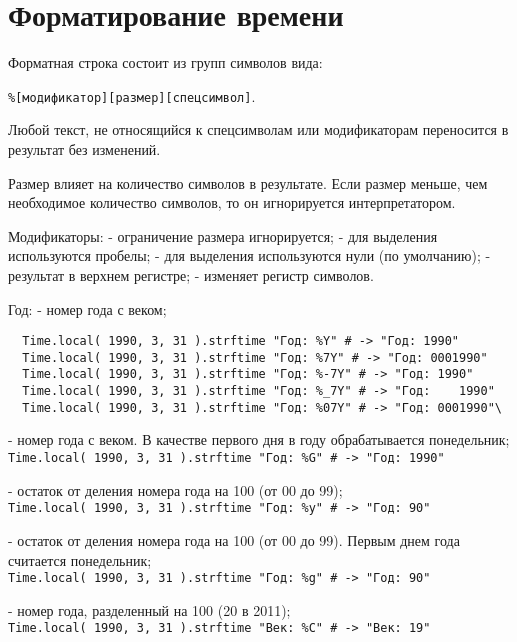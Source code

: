 \hypertarget{appdatetime}{}
\chapter{Форматирование времени}

Форматная строка состоит из групп символов вида:

\medskip\noindent\verb!%[модификатор][размер][спецсимвол]!. 

Любой текст, не относящийся к спецсимволам или модификаторам переносится в результат без изменений. 

Размер влияет на количество символов в результате. Если размер меньше, чем необходимое количество символов, то он игнорируется интерпретатором.

\begin{keylist}{Модификаторы:}
  \firstkey{-} - ограничение размера игнорируется;
  \key{_} - для выделения используются пробелы;
   - для выделения используются нули (по умолчанию);
  \key{\textasciicircum} - результат в верхнем регистре;
  \key{\#} - изменяет регистр символов.
\end{keylist}

\begin{keylist}{Год:}
   - номер года с веком;  
  \begin{verbatim}
  Time.local( 1990, 3, 31 ).strftime "Год: %Y" # -> "Год: 1990"
  Time.local( 1990, 3, 31 ).strftime "Год: %7Y" # -> "Год: 0001990"
  Time.local( 1990, 3, 31 ).strftime "Год: %-7Y" # -> "Год: 1990" 
  Time.local( 1990, 3, 31 ).strftime "Год: %_7Y" # -> "Год:    1990" 
  Time.local( 1990, 3, 31 ).strftime "Год: %07Y" # -> "Год: 0001990"\
  \end{verbatim}    
     
   - номер года с веком. В качестве первого дня в году обрабатывается понедельник; 
  \\\verb!Time.local( 1990, 3, 31 ).strftime "Год: %G" # -> "Год: 1990"!
    
   - остаток от деления номера года на 100 (от 00 до 99);  
  \\\verb!Time.local( 1990, 3, 31 ).strftime "Год: %y" # -> "Год: 90"!
    
   - остаток от деления номера года на 100 (от 00 до 99). Первым днем года считается понедельник; 
  \\\verb!Time.local( 1990, 3, 31 ).strftime "Год: %g" # -> "Год: 90"!
    
   - номер года, разделенный на 100 (20 в 2011);  
  \\\verb!Time.local( 1990, 3, 31 ).strftime "Век: %C" # -> "Век: 19"!
\end{keylist}

